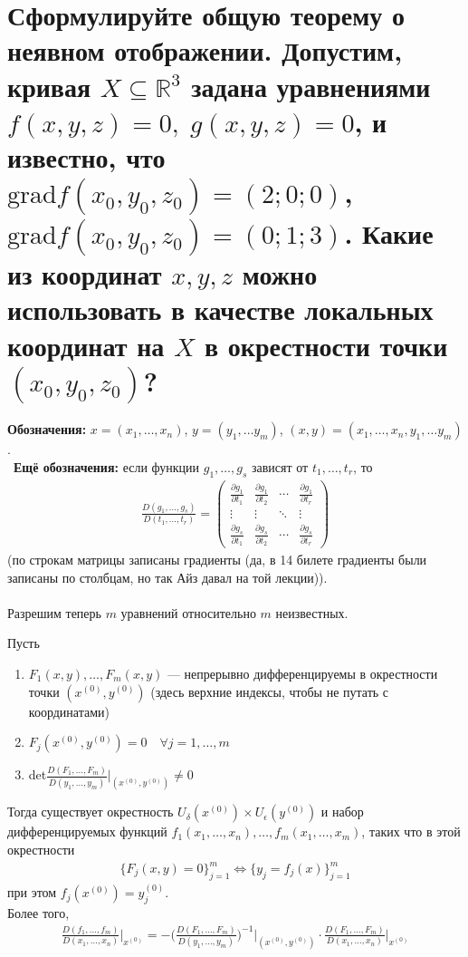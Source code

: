\documentclass{article}
\begin{document}
\section{Сформулируйте общую теорему о неявном отображении. Допустим, кривая $X \subseteq \mathbb{R}^3$ задана уравнениями $f(x,y,z)=0,\; g(x,y,z)=0$, и известно, что $\mathrm{grad}f(x_0,y_0,z_0)=(2;0;0)$, $\mathrm{grad}f(x_0, y_0, z_0)=(0;1;3)$. Какие из координат $x,y,z$ можно использовать в качестве локальных координат на $X$ в окрестности точки $(x_0,y_0,z_0)$?}
\textbf{Обозначения:}
$x=(x_1, \dotsc, x_n)$, $y=(y_1, \dotsc y_m)$, $(x, y) = (x_1, \dotsc, x_n, y_1, \dotsc y_m)$.\\\
\textbf{Ещё обозначения:} если функции $g_1,\dotsc,g_s$ зависят от $t_1,\dotsc,t_r$, то
\begin{gather*}
    \frac{D(g_1,\dotsc,g_s)}{D(t_1,\dotsc,t_r)} =
    \begin{pmatrix}
        \frac{\partial g_1}{\partial t_1} & \frac{\partial g_1}{\partial t_2} & \cdots & \frac{\partial g_1}{\partial t_r} \\
        \vdots & \vdots & \ddots & \vdots \\
        \frac{\partial g_s}{\partial t_1} & \frac{\partial g_s}{\partial t_2} & \cdots & \frac{\partial g_s}{\partial t_r}
    \end{pmatrix}
\end{gather*}
(по строкам матрицы записаны градиенты (да, в 14 билете градиенты были записаны по столбцам, но так Айз давал на той лекции)).\\\\
Разрешим теперь $m$ уравнений относительно $m$ неизвестных.\\
\begin{theorem}
Пусть
\begin{enumerate}
    \item $F_1 (x,y),\dotsc,F_m(x,y)$ --- непрерывно дифференцируемы в окрестности точки $(x^{(0)}, y^{(0)})$ (здесь верхние индексы, чтобы не путать с координатами)
    \item $F_j(x^{(0)}, y^{(0)})=0 \quad \forall j=1,\dotsc,m$
    \item det$\frac{D(F_1,\dotsc,F_m)}{D(y_1,\dotsc,y_m)}|_{(x^{(0)}, y^{(0)})}\not=0$
\end{enumerate}
Тогда существует окрестность $U_\delta(x^{(0)}) \times U_\epsilon(y^{(0)})$ и набор дифференцируемых функций $f_1(x_1,\dotsc,x_n),\dots,f_m(x_1,\dotsc,x_m)$, таких что в этой окрестности
\begin{gather*}
    \{F_j(x,y)=0\}^m_{j=1} \Leftrightarrow \{y_j=f_j(x)\}^m_{j=1}
\end{gather*}
при этом $f_j(x^{(0)})=y_j^{(0)}$.\\
Более того,
\begin{gather*}
    \frac{D(f_1,\dotsc, f_m)}{D(x_1,\dotsc,x_n)}\Big|_{x^{(0)}}=-\Big(\frac{D(F_1,\dotsc,F_m)}{D(y_1,\dotsc,y_m)}\Big)^{-1}\Big|_{(x^{(0)}, y^{(0)})} \cdot \frac{D(F_1,\dotsc,F_m)}{D(x_1,\dotsc,x_n)}\Big|_{x^{(0)}}
\end{gather*}
\end{theorem}
\end{document}

